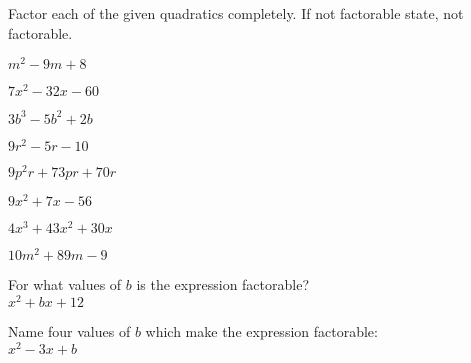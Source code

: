 \documentclass{report}
\theoremstyle{definition}
\begin{document}
\noindent Factor each of the given quadratics completely. If not factorable state, not factorable.
\begin{enumerate}

	\begin{minipage}[t]{0.45\linewidth}
		\item $m^2-9m+8$ \\
		\vspace{2.75cm}
	\end{minipage}
	\hfill
	\begin{minipage}[t]{0.45\linewidth}
		\item $7x^2-32x-60$\\
		\vspace{2.75cm}
	\end{minipage}
	\begin{minipage}[t]{0.45\linewidth}
		\item $3b^3-5b^2+2b$ \\
		\vspace{2.75cm}
	\end{minipage}
	\hfill
	\begin{minipage}[t]{0.45\linewidth}
		\item $9r^2-5r-10$\\
		\vspace{2.75cm}
	\end{minipage}
	\begin{minipage}[t]{0.45\linewidth}
		\item $9p^2r+73pr+70r$\\
		\vspace{2.75cm}
	\end{minipage}
	\hfill
	\begin{minipage}[t]{0.45\linewidth}
		\item $9x^2+7x-56$\\
		\vspace{2.75cm}
	\end{minipage}
	\begin{minipage}[t]{0.45\linewidth}
		\item $4x^3+43x^2+30x$ \\
		\vspace{2.75cm}
	\end{minipage}
	\hfill
	\begin{minipage}[t]{0.45\linewidth}
		\item $10m^2+89m-9$\\
		\vspace{2.75cm}
	\end{minipage}
	\begin{minipage}[t]{0.45\linewidth}
		\item For what values of $b$ is the expression factorable? \\
		$x^2+bx+12$
		\vspace{3cm}
	\end{minipage}
	\hfill
	\begin{minipage}[t]{0.45\linewidth}
		\item Name four values of $b$ which make the expression factorable:\\
		$x^2-3x+b$
		\vspace{3cm}
	\end{minipage}


\end{enumerate}
\end{document}
